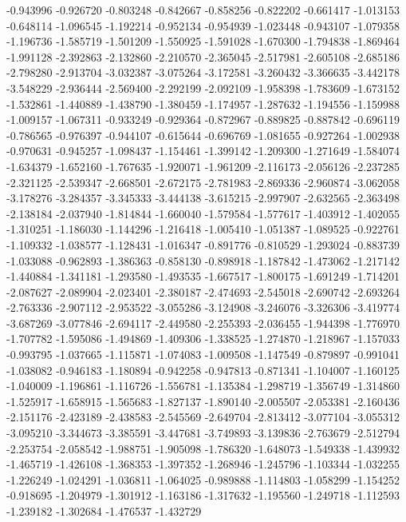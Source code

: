 -0.943996
-0.926720
-0.803248
-0.842667
-0.858256
-0.822202
-0.661417
-1.013153
-0.648114
-1.096545
-1.192214
-0.952134
-0.954939
-1.023448
-0.943107
-1.079358
-1.196736
-1.585719
-1.501209
-1.550925
-1.591028
-1.670300
-1.794838
-1.869464
-1.991128
-2.392863
-2.132860
-2.210570
-2.365045
-2.517981
-2.605108
-2.685186
-2.798280
-2.913704
-3.032387
-3.075264
-3.172581
-3.260432
-3.366635
-3.442178
-3.548229
-2.936444
-2.569400
-2.292199
-2.092109
-1.958398
-1.783609
-1.673152
-1.532861
-1.440889
-1.438790
-1.380459
-1.174957
-1.287632
-1.194556
-1.159988
-1.009157
-1.067311
-0.933249
-0.929364
-0.872967
-0.889825
-0.887842
-0.696119
-0.786565
-0.976397
-0.944107
-0.615644
-0.696769
-1.081655
-0.927264
-1.002938
-0.970631
-0.945257
-1.098437
-1.154461
-1.399142
-1.209300
-1.271649
-1.584074
-1.634379
-1.652160
-1.767635
-1.920071
-1.961209
-2.116173
-2.056126
-2.237285
-2.321125
-2.539347
-2.668501
-2.672175
-2.781983
-2.869336
-2.960874
-3.062058
-3.178276
-3.284357
-3.345333
-3.444138
-3.615215
-2.997907
-2.632565
-2.363498
-2.138184
-2.037940
-1.814844
-1.660040
-1.579584
-1.577617
-1.403912
-1.402055
-1.310251
-1.186030
-1.144296
-1.216418
-1.005410
-1.051387
-1.089525
-0.922761
-1.109332
-1.038577
-1.128431
-1.016347
-0.891776
-0.810529
-1.293024
-0.883739
-1.033088
-0.962893
-1.386363
-0.858130
-0.898918
-1.187842
-1.473062
-1.217142
-1.440884
-1.341181
-1.293580
-1.493535
-1.667517
-1.800175
-1.691249
-1.714201
-2.087627
-2.089904
-2.023401
-2.380187
-2.474693
-2.545018
-2.690742
-2.693264
-2.763336
-2.907112
-2.953522
-3.055286
-3.124908
-3.246076
-3.326306
-3.419774
-3.687269
-3.077846
-2.694117
-2.449580
-2.255393
-2.036455
-1.944398
-1.776970
-1.707782
-1.595086
-1.494869
-1.409306
-1.338525
-1.274870
-1.218967
-1.157033
-0.993795
-1.037665
-1.115871
-1.074083
-1.009508
-1.147549
-0.879897
-0.991041
-1.038082
-0.946183
-1.180894
-0.942258
-0.947813
-0.871341
-1.104007
-1.160125
-1.040009
-1.196861
-1.116726
-1.556781
-1.135384
-1.298719
-1.356749
-1.314860
-1.525917
-1.658915
-1.565683
-1.827137
-1.890140
-2.005507
-2.053381
-2.160436
-2.151176
-2.423189
-2.438583
-2.545569
-2.649704
-2.813412
-3.077104
-3.055312
-3.095210
-3.344673
-3.385591
-3.447681
-3.749893
-3.139836
-2.763679
-2.512794
-2.253754
-2.058542
-1.988751
-1.905098
-1.786320
-1.648073
-1.549338
-1.439932
-1.465719
-1.426108
-1.368353
-1.397352
-1.268946
-1.245796
-1.103344
-1.032255
-1.226249
-1.024291
-1.036811
-1.064025
-0.989888
-1.114803
-1.058299
-1.154252
-0.918695
-1.204979
-1.301912
-1.163186
-1.317632
-1.195560
-1.249718
-1.112593
-1.239182
-1.302684
-1.476537
-1.432729
